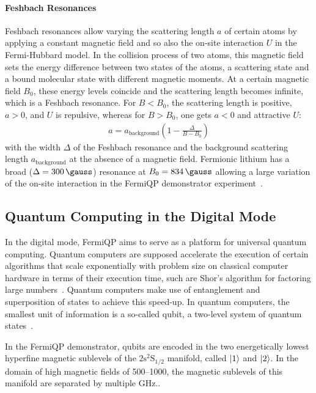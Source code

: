 \paragraph*{Feshbach Resonances} Feshbach resonances allow varying the scattering length $a$ of certain atoms by applying a constant magnetic field and so also the on-site interaction $U$ in the Fermi-Hubbard model. In the collision process of two atoms, this magnetic field sets the energy difference between two states of the atoms, a scattering state and a bound molecular state with different magnetic moments. At a certain magnetic field $B_0$, these energy levels coincide and the scattering length becomes infinite, which is a Feshbach resonance. For $B < B_0$, the scattering length is positive, $a > 0$, and $U$ is repulsive, whereas for $B > B_0$, one gets $a < 0$ and attractive $U$:
\begin{align}
    a = a_\text{background} \left(1 - \frac{\Delta}{B-B_0}\right)
\end{align}
with the width $\Delta$ of the Feshbach resonance and the background scattering length $a_\text{background}$ at the absence of a magnetic field. Fermionic lithium has a broad ($\Delta = \SI[]{300}{\gauss}$) resonance at $B_0 = \SI[]{834}{\gauss}$ allowing a large variation of the on-site interaction in the FermiQP demonstrator experiment~\cite{chin_feshbach_2010}.

\subsection*{Quantum Computing in the Digital Mode}
In the digital mode, FermiQP aims to serve as a platform for universal quantum computing. Quantum computers are supposed accelerate the execution of certain algorithms that scale exponentially with problem size on classical computer hardware in terms of their execution time, such are Shor's algorithm for factoring large numbers~\cite{shor_algorithms_1994}. Quantum computers make use of entanglement and superposition of states to achieve this speed-up. In quantum computers, the smallest unit of information is a so-called qubit, a two-level system of quantum states~\cite{mainzer_quantencomputer_2020}.

In the FermiQP demonstrator, qubits are encoded in the two energetically lowest hyperfine magnetic sublevels of the $2\text{s}^2\text{S}_{1/2}$ manifold, called $\Ket{1}$ and $\Ket{2}$. In the domain of high magnetic fields of \SIrange[]{500}{1000}{\gauss}, the magnetic sublevels of this manifold are separated by multiple \si[]{\giga\hertz}.\cite{gehm_properties_2003,wei_magnetic-field_2013}.

